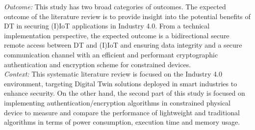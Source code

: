 \textit{Outcome:} This study has two broad categories of outcomes. The expected outcome of the literature review is to provide insight into the potential benefits of DT in securing (I)IoT applications in Industry 4.0. From a technical implementation perspective, the expected outcome is a bidirectional secure remote access between DT and (I)IoT and ensuring data integrity and a secure communication channel with an efficient and performant cryptographic authentication and encryption scheme for constrained devices.\\

\textit{Context:} This systematic literature review is focused on the Industry 4.0 environment, targeting Digital Twin solutions deployed in smart industries to enhance security. On the other hand, the second part of this study is focused on implementing authentication/encryption algorithms in constrained physical device to measure and compare the performance of lightweight and traditional algorithms in terms of power consumption, execution time and memory usage. 